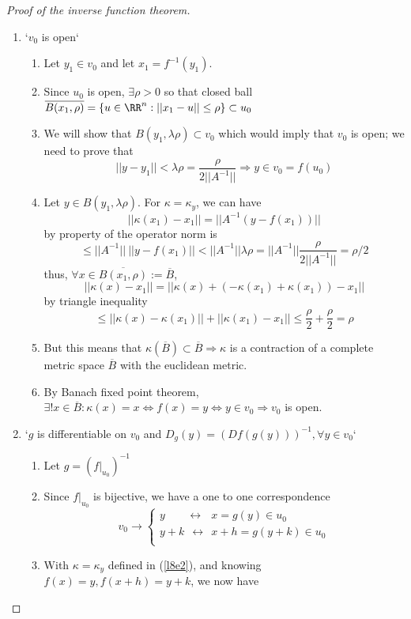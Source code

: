 \begin{proof}[Proof of the inverse function theorem]
\begin{enumerate}[I]
  \item `$v_0$ is open`
    \begin{enumerate}
    \item Let $y_1 \in v_0$ and let $x_1 = f^{-1}(y_1)$.
    \item Since $u_0$ is open, $\exists \rho > 0$ so that closed ball $\overline{B(x_1, \rho)} = \{u\in \RR^n:||x_1-u|| \leq \rho\} \subset u_0$
    \item We will show that $B(y_1, \lambda \rho) \subset v_0$ which would imply that $v_0$ is open; we need to prove that
      $$||y - y_1|| < \lambda \rho = \frac{\rho}{2||A^{-1}||} \Rightarrow y\in v_0 = f(u_0)$$
    \item Let $y \in B(y_1, \lambda \rho)$. For $\kappa = \kappa_y$, we can have
      $$||\kappa(x_1) - x_1|| = ||A^{-1}(y-f(x_1))||$$
      by property of the operator norm is
      $$\leq ||A^{-1}||\ ||y-f(x_1)|| < ||A^{-1}||\lambda \rho = ||A^{-1}||\frac{\rho}{2||A^{-1}||} = \rho / 2 $$
      thus, $\forall x \in \overline{B(x_1, \rho)} := \overline{B}$,
      $$||\kappa(x)-x_1|| = ||\kappa(x) + (-\kappa(x_1) + \kappa(x_1)) - x_1||$$
      by triangle inequality
      $$\leq ||\kappa(x) - \kappa(x_1)|| + ||\kappa(x_1) - x_1|| \leq \frac{\rho}{2} + \frac{\rho}{2} = \rho$$
    \item But this means that $\kappa(\overline{B}) \subset \overline{B} \Rightarrow \kappa$ is a contraction of a complete metric space $\overline{B}$ with the euclidean metric.
    \item By Banach fixed point theorem, $\exists ! x \in \overline{B} : \kappa(x) = x \Leftrightarrow f(x) = y \Leftrightarrow y \in v_0 \Rightarrow v_0$ is open.
    \end{enumerate}
  \item `$g$ is differentiable on $v_0$ and $D_g(y) = (Df(g(y)))^{-1}, \forall y \in v_0$`
    \begin{enumerate}
    \item Let $g = (f|_{u_0})^{-1}$
    \item Since $f|_{u_0}$ is bijective, we have a one to one correspondence
      $$v_0 \rightarrow
      \begin{cases}
        y \phantom{+ k}\:\:\:\leftrightarrow\:\:\: x = g(y) \in u_0 \\
        y + k \:\:\leftrightarrow\:\: x + h = g(y+k) \in u_0 \\
      \end{cases}
      $$
    \item With $\kappa=\kappa_y$ defined in (\ref{l8e2}), and knowing $f(x) = y, f(x+h) = y+k$, we now have

\end{enumerate}
\end{enumerate}
\end{proof}

